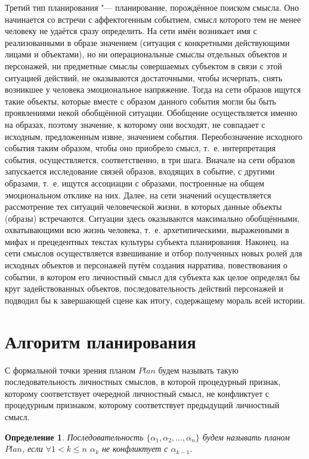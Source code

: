 \documentclass[a4paper, 12pt]{article}
\theoremstyle{plain}
\newtheorem{Def}{Определение}
\begin{document}
	Третий тип планирования "--- планирование, порождённое поиском смысла. Оно начинается со встречи с аффектогенным событием, смысл которого тем не менее человеку не удаётся сразу определить. На сети имён возникает имя с реализованными в образе значением (ситуация с конкретными действующими лицами и объектами), но ни операциональные смыслы отдельных объектов и персонажей, ни предметные смыслы совершаемых субъектом в связи с этой ситуацией действий, не оказываются достаточными, чтобы исчерпать, снять возникшее у человека эмоциональное напряжение. Тогда на сети образов ищутся такие объекты, которые вместе с образом данного события могли бы быть проявлениями некой обобщённой ситуации. Обобщение осуществляется именно на образах, поэтому значение, к которому они восходят, не совпадает с исходным, предложенным извне, значением события. Переобозначение исходного события таким образом, чтобы оно приобрело смысл, т.~е. интерпретация события, осуществляется, соответственно, в три шага. Вначале на сети образов запускается исследование связей образов, входящих в событие, с другими образами, т.~е. ищутся ассоциации с образами, построенные на общем эмоциональном отклике на них. Далее, на сети значений осуществляется рассмотрение тех ситуаций человеческой жизни, в которых данные объекты (образы) встречаются. Ситуации здесь оказываются максимально обобщёнными, охватывающими всю жизнь человека, т.~е. архетипическими, выраженными в мифах и прецедентных текстах культуры субъекта планирования. Наконец, на сети смыслов осуществляется взвешивание и отбор полученных новых ролей для исходных объектов и персонажей путём создания нарратива, повествования о событии, в котором его личностный смысл для субъекта как целое определял бы круг задействованных объектов, последовательность действий персонажей и подводил бы к завершающей сцене как итогу, содержащему мораль всей истории.

	\section{Алгоритм планирования} С формальной точки зрения планом $Plan$ будем называть такую последовательность личностных смыслов, в которой процедурный признак, которому соответствует очередной личностный смысл, не конфликтует с процедурным признаком, которому соответствует предыдущий личностный смысл.
	
	\begin{Def}
		Последовательность $\{\alpha_1,\alpha_2,\dots,\alpha_n\}$ будем называть планом $Plan$, если $\forall 1<k\leqslant n$ $\alpha_k$ не конфликтует с $\alpha_{k-1}$.
	\end{Def}
\end{document}
